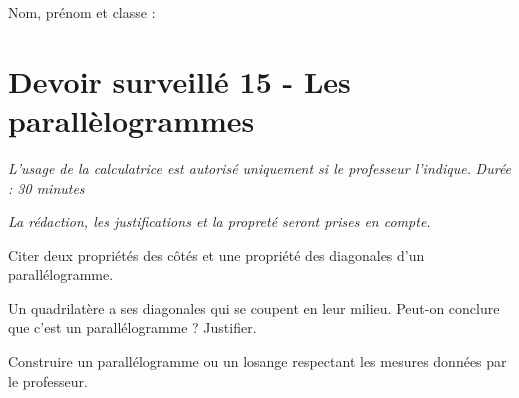\documentclass[a4paper,10pt]{report}
\begin{document}
\pagestyle{empty}
\noindent Nom, prénom et classe : \dotfill

\section*{Devoir surveillé 15 - Les parallèlogrammes}

\noindent \textit{L'usage de la calculatrice est autorisé uniquement si le professeur l'indique.} \hfill \textit{Durée : 30 minutes}

\medskip
\noindent \textit{La rédaction, les justifications et la propreté seront prises en compte.}


\begin{ex}[Propriétés]
Citer deux propriétés des côtés et une propriété des diagonales d'un parallélogramme.
\medskip\noindent\grandscarreaux{\linewidth}{3cm}
\end{ex}
\begin{ex}[Reconnaître]
Un quadrilatère a ses diagonales qui se coupent en leur milieu. Peut-on conclure que c'est un parallélogramme ? Justifier.
\medskip\noindent\grandscarreaux{\linewidth}{3cm}
\end{ex}
\begin{ex}[Construction]
Construire un parallélogramme ou un losange respectant les mesures données par le professeur.
\medskip\noindent\grandscarreaux{\linewidth}{6cm}
\end{ex}
\end{document}
